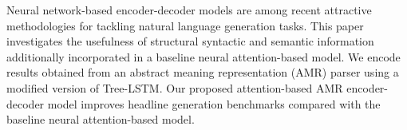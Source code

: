 Neural network-based encoder-decoder models are among recent attractive methodologies for tackling natural language generation tasks. This paper investigates the usefulness of structural syntactic and semantic information additionally incorporated in a baseline neural attention-based model. We encode results obtained from an abstract meaning representation (AMR) parser using a modified version of Tree-LSTM. Our proposed attention-based AMR encoder-decoder model improves headline generation benchmarks compared with the baseline neural attention-based model.
